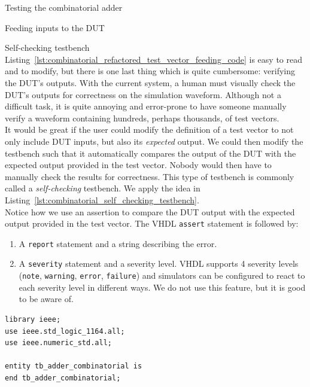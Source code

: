 \documentclass[lab]{course}
\begin{document}
\begin{section}{Testing the combinatorial adder}
\begin{subsection}{Feeding inputs to the DUT}
        \clearpage

        \begin{subsubsection}{Self-checking testbench}
            Listing~\ref{lst:combinatorial_refactored_test_vector_feeding_code} is easy to read and to modify, but there is one last thing which is quite cumbersome: verifying the DUT's outputs. With the current system, a human must visually check the DUT's outputs for correctness on the simulation waveform. Although not a difficult task, it is quite annoying and error-prone to have someone manually verify a waveform containing hundreds, perhaps thousands, of test vectors. \\

            It would be great if the user could modify the definition of a test vector to not only include DUT inputs, but also its \emph{expected} output. We could then modify the testbench such that it automatically compares the output of the DUT with the expected output provided in the test vector. Nobody would then have to manually check the results for correctness. This type of testbench is commonly called a \emph{self-checking} testbench. We apply the idea in Listing~\ref{lst:combinatorial_self_checking_testbench}. \\

            Notice how we use an assertion to compare the DUT output with the expected output provided in the test vector. The VHDL \verb+assert+ statement is followed by:

            \begin{enumerate}
                \item A \verb+report+ statement and a string describing the error.
                \item A \verb+severity+ statement and a severity level. VHDL supports 4 severity levels (\verb+note+, \verb+warning+, \verb+error+, \verb+failure+) and simulators can be configured to react to each severity level in different ways. We do not use this feature, but it is good to be aware of.
            \end{enumerate}

            \begin{lstlisting}[caption={Self-checking testbench: updated \texttt{check\_add} procedure to automatically compare DUT output against expected output provided in test vector}, label={lst:combinatorial_self_checking_testbench}]
library ieee;
use ieee.std_logic_1164.all;
use ieee.numeric_std.all;

entity tb_adder_combinatorial is
end tb_adder_combinatorial;


\end{lstlisting}
\end{subsubsection}
\end{subsection}
\end{section}
\end{document}
